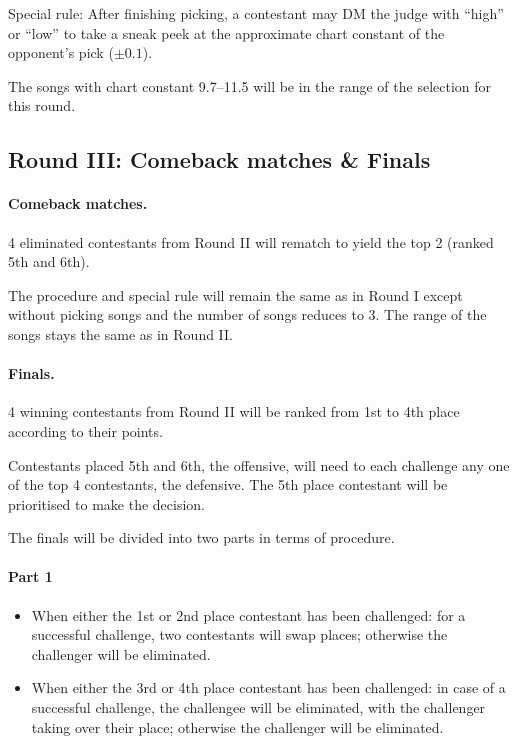 \documentclass{article}
\newcommand{\alert}[1]{{\color{red} #1}}
\newcommand{\srbgcolor}{red!40}
\newcommand{\specialrule}[1]{\hfuzz=100pt  %
	\colorbox{\srbgcolor}{\parbox{\textwidth}{#1}}}
\begin{document}
\specialrule{
	Special rule: After finishing picking,
	a contestant may DM the judge with ``high'' or ``low''
	to take a sneak peek at
	the approximate chart constant of the opponent's pick
	($\pm0.1$).
}

\nopagebreak

\alert{
	The songs with chart constant 9.7--11.5
	will be in the range of the selection for this round.
}

\subsection{Round III: Comeback %
	matches \& Finals}

\paragraph{Comeback matches.}
4 eliminated contestants
from Round II will rematch to yield the top 2
(ranked 5th and 6th).

The procedure and \colorbox{\srbgcolor}{special rule}
will remain the same as in Round I
except without picking songs
and the number of songs reduces to 3.
The range of the songs stays the same as in Round II.

\paragraph{Finals.}
4 winning contestants from Round II
will be ranked from 1st to 4th place
according to their points.

Contestants placed 5th and 6th, the offensive,
will need to each challenge any
one of the top 4 contestants, the defensive.
The 5th place contestant will be prioritised to make the decision.

The finals will be divided into two parts in terms of procedure.

\paragraph{Part 1}

\begin{itemize}
	\item When either the 1st or 2nd place contestant has been challenged:
	      for a successful challenge, two contestants will swap places;
	      otherwise the challenger will be eliminated.

	\item When either the 3rd or 4th place contestant has been challenged:
	      in case of a successful challenge,
	      the challengee  %
	      will be eliminated, with the challenger taking over  %
	      their place;
	      otherwise the challenger will be eliminated.
\end{itemize}
\end{document}
